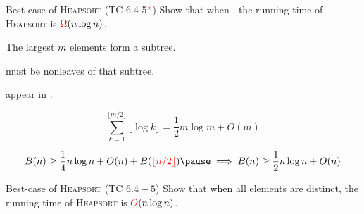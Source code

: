 \begin{frame}{}
  \begin{exampleblock}{Best-case of \textsc{Heapsort} (TC 6.4-5$\textcolor{red}{^{\star}}$)}
    Show that when , 
    the  running time of \textsc{Heapsort} is $\textcolor{red}{\Omega}(n \log n)$.
  \end{exampleblock}

  \pause
  \vspace{0.30cm}
  \begin{center}
    {}
  \end{center}

  \begin{center}
    The largest $m$ elements form a subtree. 
    \\[8pt] \pause

     must be nonleaves of that subtree. 
    \\[8pt] \pause

     appear in 
    . 
    \\[8pt] \pause

  \end{center}

  \pause
  \[
    \sum_{k=1}^{\lfloor m/2 \rfloor} \lfloor \log k \rfloor = \frac{1}{2} m \log m + O(m) 
  \]

  \pause
  \[
    B(n) \ge \frac{1}{4} n \log n + O(n) + B(\red{\lfloor n/2 \rfloor}) \pause \implies B(n) \ge \frac{1}{2} n \log n + O(n)
  \]
\end{frame}

\begin{frame}{}
  \begin{exampleblock}{Best-case of \textsc{Heapsort} (TC $6.4-5$)}
    Show that when all elements are distinct, 
    the  running time of \textsc{Heapsort} is $\textcolor{red}{O}(n \log n)$.
  \end{exampleblock}

  \pause
  \vspace{0.60cm}
  \centerline{}

  \pause
\end{frame}

